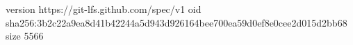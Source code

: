 version https://git-lfs.github.com/spec/v1
oid sha256:3b2c22a9ea8d41b42244a5d943d926164bee700ea59d0ef8e0cee2d015d2bb68
size 5566
